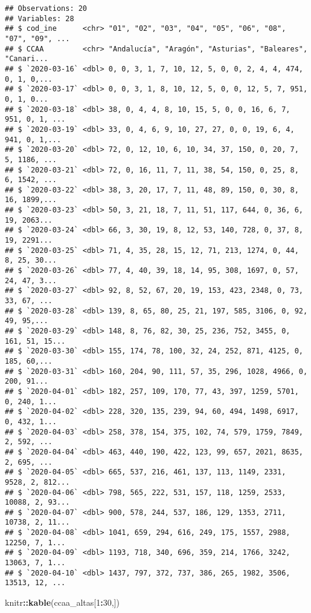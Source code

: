 \documentclass[
]{article}
\newenvironment{Shaded}{\begin{snugshade}}{\end{snugshade}}
\newcommand{\DecValTok}[1]{\textcolor[rgb]{0.00,0.00,0.81}{#1}}
\newcommand{\KeywordTok}[1]{\textcolor[rgb]{0.13,0.29,0.53}{\textbf{#1}}}
\newcommand{\NormalTok}[1]{#1}
\newcommand{\OperatorTok}[1]{\textcolor[rgb]{0.81,0.36,0.00}{\textbf{#1}}}
\begin{document}
\begin{verbatim}
## Observations: 20
## Variables: 28
## $ cod_ine      <chr> "01", "02", "03", "04", "05", "06", "08", "07", "09", ...
## $ CCAA         <chr> "Andalucía", "Aragón", "Asturias", "Baleares", "Canari...
## $ `2020-03-16` <dbl> 0, 0, 3, 1, 7, 10, 12, 5, 0, 0, 2, 4, 4, 474, 0, 1, 0,...
## $ `2020-03-17` <dbl> 0, 0, 3, 1, 8, 10, 12, 5, 0, 0, 12, 5, 7, 951, 0, 1, 0...
## $ `2020-03-18` <dbl> 38, 0, 4, 4, 8, 10, 15, 5, 0, 0, 16, 6, 7, 951, 0, 1, ...
## $ `2020-03-19` <dbl> 33, 0, 4, 6, 9, 10, 27, 27, 0, 0, 19, 6, 4, 941, 0, 1,...
## $ `2020-03-20` <dbl> 72, 0, 12, 10, 6, 10, 34, 37, 150, 0, 20, 7, 5, 1186, ...
## $ `2020-03-21` <dbl> 72, 0, 16, 11, 7, 11, 38, 54, 150, 0, 25, 8, 6, 1542, ...
## $ `2020-03-22` <dbl> 38, 3, 20, 17, 7, 11, 48, 89, 150, 0, 30, 8, 16, 1899,...
## $ `2020-03-23` <dbl> 50, 3, 21, 18, 7, 11, 51, 117, 644, 0, 36, 6, 19, 2063...
## $ `2020-03-24` <dbl> 66, 3, 30, 19, 8, 12, 53, 140, 728, 0, 37, 8, 19, 2291...
## $ `2020-03-25` <dbl> 71, 4, 35, 28, 15, 12, 71, 213, 1274, 0, 44, 8, 25, 30...
## $ `2020-03-26` <dbl> 77, 4, 40, 39, 18, 14, 95, 308, 1697, 0, 57, 24, 47, 3...
## $ `2020-03-27` <dbl> 92, 8, 52, 67, 20, 19, 153, 423, 2348, 0, 73, 33, 67, ...
## $ `2020-03-28` <dbl> 139, 8, 65, 80, 25, 21, 197, 585, 3106, 0, 92, 49, 95,...
## $ `2020-03-29` <dbl> 148, 8, 76, 82, 30, 25, 236, 752, 3455, 0, 161, 51, 15...
## $ `2020-03-30` <dbl> 155, 174, 78, 100, 32, 24, 252, 871, 4125, 0, 185, 60,...
## $ `2020-03-31` <dbl> 160, 204, 90, 111, 57, 35, 296, 1028, 4966, 0, 200, 91...
## $ `2020-04-01` <dbl> 182, 257, 109, 170, 77, 43, 397, 1259, 5701, 0, 240, 1...
## $ `2020-04-02` <dbl> 228, 320, 135, 239, 94, 60, 494, 1498, 6917, 0, 432, 1...
## $ `2020-04-03` <dbl> 258, 378, 154, 375, 102, 74, 579, 1759, 7849, 2, 592, ...
## $ `2020-04-04` <dbl> 463, 440, 190, 422, 123, 99, 657, 2021, 8635, 2, 695, ...
## $ `2020-04-05` <dbl> 665, 537, 216, 461, 137, 113, 1149, 2331, 9528, 2, 812...
## $ `2020-04-06` <dbl> 798, 565, 222, 531, 157, 118, 1259, 2533, 10088, 2, 93...
## $ `2020-04-07` <dbl> 900, 578, 244, 537, 186, 129, 1353, 2711, 10738, 2, 11...
## $ `2020-04-08` <dbl> 1041, 659, 294, 616, 249, 175, 1557, 2988, 12250, 7, 1...
## $ `2020-04-09` <dbl> 1193, 718, 340, 696, 359, 214, 1766, 3242, 13063, 7, 1...
## $ `2020-04-10` <dbl> 1437, 797, 372, 737, 386, 265, 1982, 3506, 13513, 12, ...
\end{verbatim}

\begin{Shaded}
\begin{Highlighting}[]
\NormalTok{knitr}\OperatorTok{::}\KeywordTok{kable}\NormalTok{(ccaa_altas[}\DecValTok{1}\OperatorTok{:}\DecValTok{30}\NormalTok{,])}
\end{Highlighting}
\end{Shaded}
\end{document}
